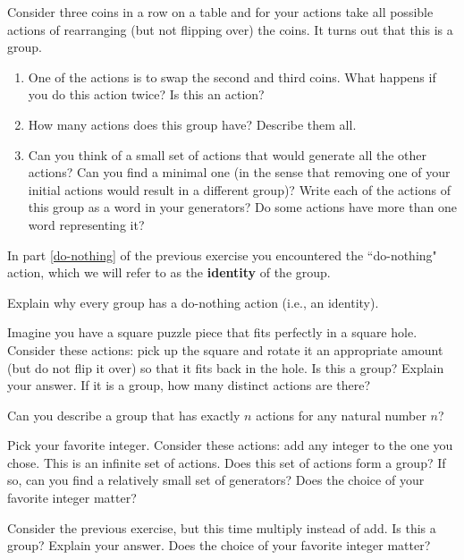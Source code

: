 \begin{exercise}
Consider three coins in a row on a table and for your actions take all possible actions of rearranging (but not flipping over) the coins.  It turns out that this is a group.
\begin{enumerate}[label=\rm{(\alph*)}]
\item\label{do-nothing} One of the actions is to swap the second and third coins.  What happens if you do this action twice?  Is this an action?  
\item How many actions does this group have?  Describe them all.
\item Can you think of a small set of actions that would generate all the other actions?  Can you find a minimal one (in the sense that removing one of your initial actions would result in a different group)?  Write each of the actions of this group as a word in your generators?  Do some actions have more than one word representing it?
\end{enumerate}
\end{exercise}

In part \ref{do-nothing} of the previous exercise you encountered the ``do-nothing" action, which we will refer to as the \textbf{identity} of the group.

\begin{exercise}
Explain why every group has a do-nothing action (i.e., an identity).
\end{exercise}

\begin{exercise}\label{exer:RotationsSquare}
Imagine you have a square puzzle piece that fits perfectly in a square hole.  Consider these actions: pick up the square and rotate it an appropriate amount (but do not flip it over) so that it fits back in the hole.  Is this a group?  Explain your answer.  If it is a group, how many distinct actions are there?
\end{exercise}

\begin{exercise}
Can you describe a group that has exactly $n$ actions for any natural number $n$?
\end{exercise}


\begin{exercise}\label{exer:introducing_Z}%
Pick your favorite integer.  Consider these actions: add any integer to the one you chose.  This is an infinite set of actions.  Does this set of actions form a group?  If so, can you find a relatively small set of generators?  Does the choice of your favorite integer matter?
\end{exercise}

\begin{exercise}
Consider the previous exercise, but this time multiply instead of add.  Is this a group?  Explain your answer. Does the choice of your favorite integer matter? 
\end{exercise}
